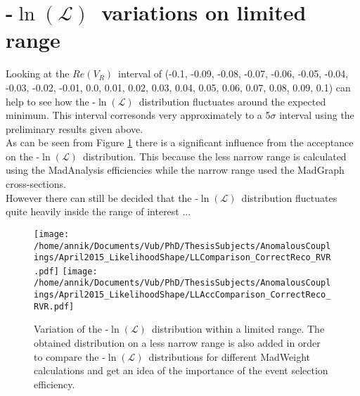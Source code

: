 \documentclass[a4paper,10pt]{article}
\newcommand{\NegLL}{-$\ln(\mathcal{L})$~}
\newcommand{\RVR}{$Re(V_R)$~}
\begin{document}
\section{\NegLL variations on limited range}

Looking at the \RVR interval of (-0.1, -0.09, -0.08, -0.07, -0.06, -0.05, -0.04, -0.03, -0.02, -0.01, 0.0, 0.01, 0.02, 0.03, 0.04, 0.05, 0.06, 0.07, 0.08, 0.09, 0.1) can help to see how the \NegLL distribution fluctuates around the expected minimum. This interval corresonds very approximately to a 5$\sigma$ interval using the preliminary results given above.\\
As can be seen from Figure \ref{fig::LLComp} there is a significant influence from the acceptance on the \NegLL distribution. This because the less narrow range is calculated using the MadAnalysis efficiencies while the narrow range used the MadGraph cross-sections.\\
However there can still be decided that the \NegLL distribution fluctuates quite heavily inside the range of interest ...

\begin{figure}[h!t]
 \centering
 \texttt{[image: /home/annik/Documents/Vub/PhD/ThesisSubjects/AnomalousCouplings/April2015\_LikelihoodShape/LLComparison\_CorrectReco\_RVR.pdf]}
 \texttt{[image: /home/annik/Documents/Vub/PhD/ThesisSubjects/AnomalousCouplings/April2015\_LikelihoodShape/LLAccComparison\_CorrectReco\_RVR.pdf]}
 \caption{Variation of the \NegLL distribution within a limited range. The obtained distribution on a less narrow range is also added in order to compare the \NegLL distributions for different MadWeight calculations and get an idea of the importance of the event selection efficiency.} \label{fig::LLComp}
\end{figure}
\end{document}
